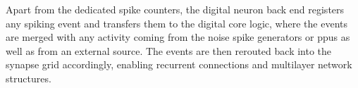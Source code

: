 Apart from the dedicated spike counters, the digital neuron back end registers any spiking event and transfers them to the digital core logic, where the events are merged with any activity coming from the noise spike generators or \glspl{ppu} as well as from an external source. The events are then rerouted back into the synapse grid accordingly, enabling recurrent connections and multilayer network structures.

